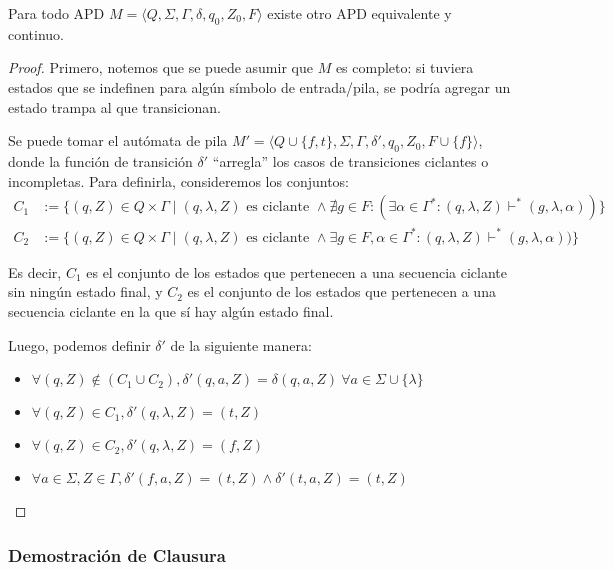 \begin{lemma*}
    Para todo APD $M = \langle Q, \Sigma, \Gamma, \delta, q_0, Z_0, F \rangle$ existe otro APD equivalente y continuo.
\end{lemma*}
\begin{proof}
    Primero, notemos que se puede asumir que $M$ es completo: si tuviera estados que se indefinen para algún símbolo de entrada/pila, se podría agregar un estado trampa al que transicionan.
    
    Se puede tomar el autómata de pila $M' = \langle Q \cup \{f, t\}, \Sigma, \Gamma, \delta', q_0, Z_0, F \cup \{f\} \rangle$, donde la función de transición $\delta'$ ``arregla'' los casos de transiciones ciclantes o incompletas. Para definirla, consideremos los conjuntos:
    $$
    \begin{aligned}
        C_1 & := \{(q, Z) \in Q \times \Gamma \mid (q, \lambda, Z) \text{ es ciclante } \land \nexists g \in F : (\exists \alpha \in \Gamma^* : (q, \lambda, Z) \vdash^* (g, \lambda, \alpha)) \} \\
        C_2 & := \{(q, Z) \in Q \times \Gamma \mid (q, \lambda, Z) \text{ es ciclante } \land \exists g \in F, \alpha \in \Gamma^* : (q, \lambda, Z) \vdash^* (g, \lambda, \alpha)) \}
    \end{aligned}
    $$

    Es decir, $C_1$ es el conjunto de los estados que pertenecen a una secuencia ciclante sin ningún estado final, y $C_2$ es el conjunto de los estados que pertenecen a una secuencia ciclante en la que sí hay algún estado final.

    Luego, podemos definir $\delta'$ de la siguiente manera:
    \begin{itemize}
        \item $\forall (q, Z) \notin (C_1 \cup C_2), \delta'(q, a, Z) = \delta(q, a, Z)\ \forall a \in \Sigma \cup \{\lambda\}$
        \item $\forall (q, Z) \in C_1, \delta'(q, \lambda, Z) = (t, Z)$
        \item $\forall (q, Z) \in C_2, \delta'(q, \lambda, Z) = (f, Z)$
        \item $\forall a \in \Sigma, Z \in \Gamma, \delta'(f, a, Z) = (t, Z) \land \delta'(t, a, Z) = (t, Z)$
    \end{itemize}
\end{proof}

\subsubsection{Demostración de Clausura}

